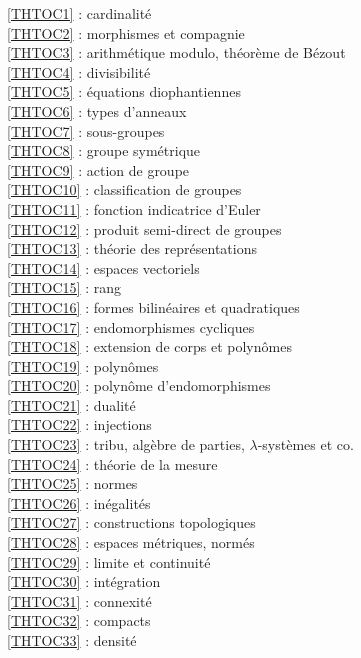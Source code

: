 \ref {THTOC1} : cardinalité\\
\ref {THTOC2} : morphismes et compagnie\\
\ref {THTOC3} : arithmétique modulo, théorème de Bézout\\
\ref {THTOC4} : divisibilité\\
\ref {THTOC5} : équations diophantiennes\\
\ref {THTOC6} : types d'anneaux\\
\ref {THTOC7} : sous-groupes\\
\ref {THTOC8} : groupe symétrique\\
\ref {THTOC9} : action de groupe\\
\ref {THTOC10} : classification de groupes\\
\ref {THTOC11} : fonction indicatrice d'Euler\\
\ref {THTOC12} : produit semi-direct de groupes\\
\ref {THTOC13} : théorie des représentations\\
\ref {THTOC14} : espaces vectoriels\\
\ref {THTOC15} : rang\\
\ref {THTOC16} : formes bilinéaires et quadratiques\\
\ref {THTOC17} : endomorphismes cycliques\\
\ref {THTOC18} : extension de corps et polynômes\\
\ref {THTOC19} : polynômes\\
\ref {THTOC20} : polynôme d'endomorphismes\\
\ref {THTOC21} : dualité\\
\ref {THTOC22} : injections\\
\ref {THTOC23} : tribu, algèbre de parties, \( \lambda \)-systèmes et co.\\
\ref {THTOC24} : théorie de la mesure\\
\ref {THTOC25} : normes\\
\ref {THTOC26} : inégalités\\
\ref {THTOC27} : constructions topologiques\\
\ref {THTOC28} : espaces métriques, normés\\
\ref {THTOC29} : limite et continuité\\
\ref {THTOC30} : intégration\\
\ref {THTOC31} : connexité\\
\ref {THTOC32} : compacts\\
\ref {THTOC33} : densité\\
